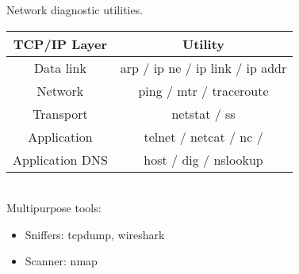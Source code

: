 \begin{frame}{Network diagnostic utilities.}
  \begin{tabular}{ | c | c | }
    \hline
    TCP/IP Layer & Utility \\ \hline 
    Data link & arp / ip ne / ip link / ip addr \\ \hline
    Network & ping / mtr / traceroute \\ \hline
    Transport & netstat / ss \\ \hline
    Application & telnet / netcat / nc /  \\ \hline
    Application DNS & host / dig / nslookup  \\ \hline
  \end{tabular}
    \\
   Multipurpose tools:
		\begin{itemize}
			\item Sniffers: tcpdump, wireshark
			\item Scanner: nmap
		\end{itemize}

\end{frame}


%
%
%	
%
%	
%	
%
%
%
